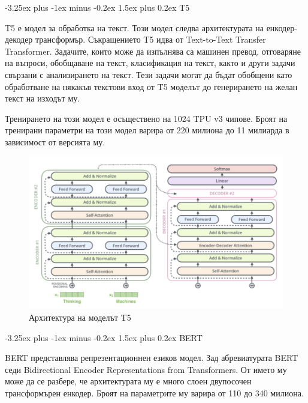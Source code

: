 \documentclass{article}
\makeatletter
\newcounter{subsubsubsection}[subsubsection]
\renewcommand\paragraph{\@startsection{paragraph}{5}{\z@}%
{3.25ex \@plus1ex \@minus.2ex}%
{-1em}%
{\normalfont\normalsize\bfseries}}
\renewcommand{\paragraph}{\@startsection{paragraph}{4}{0ex}%
{-3.25ex plus -1ex minus -0.2ex}%
{1.5ex plus 0.2ex}%
{\normalfont\normalsize\bfseries}}
\makeatother
\begin{document}

    \paragraph{T5}

    T5 е модел за обработка на текст. Този модел следва архитектурата на енкодер-декодер трансформър. Съкращението T5 идва
    от Text-to-Text Transfer Transformer. Задачите, които може да изпълнява са машинен превод, отговаряне на въпроси,
    обобщаване на текст, класификация на текст, както и други задачи свързани с анализирането на текст. Тези задачи могат
    да бъдат обобщени като обработване на някакъв текстови вход от T5 моделът до генерирането на желан текст на изходът му.

    Тренирането на този модел е осъществено на 1024 TPU v3 чипове. Броят на тренирани параметри на този модел варира от 220
    милиона до 11 милиарда в зависимост от версията му. \cite{t5}

    \begin{figure}[H]
        \centering
        \captionsetup{justification=centering}
        \includegraphics[width=450px, keepaspectratio]{chapter-02/t5.png}
        \caption{Архитектура на моделът T5}
    \end{figure}

    \paragraph{BERT}

    BERT представлява репрезентационнен езиков модел. Зад абревиатурата BERT седи Bidirectional Encoder Representations
    from Transformers. От името му може да се разбере, че архитектурата му е много слоен двупосочен трансформърен енкодер.
    Броят на параметрите му варира от 110 до 340 милиона. \cite{bert}
\end{document}
